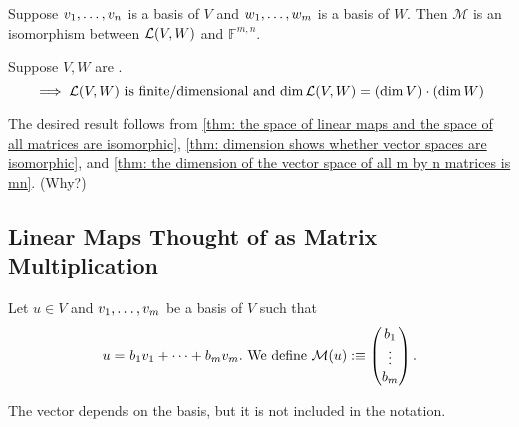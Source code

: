   \begin{thm}
    \label{thm: the space of linear maps and the space of all matrices are isomorphic}
    Suppose $v_1, \dots, v_n$ is a basis of $V$ and $w_1, \dots, w_m$ is a basis of $W$. Then $\mathcal{M}$ is an isomorphism between ${\mathcal{L}(V,W)}$ and $\mathbb{F}^{m,n}$.
  \end{thm}

  \begin{thm}
    Suppose $V,W$ are \fd.
    \begin{equation}
      \implies \lvw $ is \fd and $\dim \lvw = (\dim V)\cdot(\dim W)
    \end{equation}
  \end{thm}
  \begin{prf}
    The desired result follows from \ref{thm: the space of linear maps and the space of all matrices are isomorphic}, \ref{thm: dimension shows whether vector spaces are isomorphic}, and \ref{thm: the dimension of the vector space of all m by n matrices is mn}. (Why?)
  \end{prf}

  \subsection{Linear Maps Thought of as Matrix Multiplication}

  \begin{mydef} 
    Let $u \in V$ and $v_1, \dots, v_m$ be a basis of $V$ such that
  \begin{equation}
    u=b_1v_1+\dots+b_mv_m. $ We define $
        \mathcal{M}(u) :\equiv
      \left (
      \begin{matrix}
        b_1 \\ \vdots \\ b_m
      \end{matrix}
      \right ).
  \end{equation}

    The vector depends on the basis, but it is not included in the notation.

  \end{mydef}

